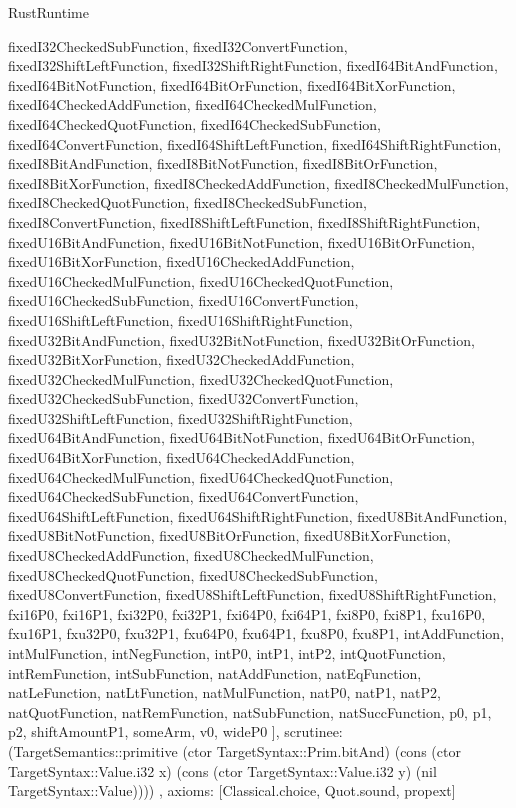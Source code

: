 \begin{lexlean}{RustRuntime}
\begin{semanticmodule}
{{      fixedI32CheckedSubFunction,
      fixedI32ConvertFunction,
      fixedI32ShiftLeftFunction,
      fixedI32ShiftRightFunction,
      fixedI64BitAndFunction,
      fixedI64BitNotFunction,
      fixedI64BitOrFunction,
      fixedI64BitXorFunction,
      fixedI64CheckedAddFunction,
      fixedI64CheckedMulFunction,
      fixedI64CheckedQuotFunction,
      fixedI64CheckedSubFunction,
      fixedI64ConvertFunction,
      fixedI64ShiftLeftFunction,
      fixedI64ShiftRightFunction,
      fixedI8BitAndFunction,
      fixedI8BitNotFunction,
      fixedI8BitOrFunction,
      fixedI8BitXorFunction,
      fixedI8CheckedAddFunction,
      fixedI8CheckedMulFunction,
      fixedI8CheckedQuotFunction,
      fixedI8CheckedSubFunction,
      fixedI8ConvertFunction,
      fixedI8ShiftLeftFunction,
      fixedI8ShiftRightFunction,
      fixedU16BitAndFunction,
      fixedU16BitNotFunction,
      fixedU16BitOrFunction,
      fixedU16BitXorFunction,
      fixedU16CheckedAddFunction,
      fixedU16CheckedMulFunction,
      fixedU16CheckedQuotFunction,
      fixedU16CheckedSubFunction,
      fixedU16ConvertFunction,
      fixedU16ShiftLeftFunction,
      fixedU16ShiftRightFunction,
      fixedU32BitAndFunction,
      fixedU32BitNotFunction,
      fixedU32BitOrFunction,
      fixedU32BitXorFunction,
      fixedU32CheckedAddFunction,
      fixedU32CheckedMulFunction,
      fixedU32CheckedQuotFunction,
      fixedU32CheckedSubFunction,
      fixedU32ConvertFunction,
      fixedU32ShiftLeftFunction,
      fixedU32ShiftRightFunction,
      fixedU64BitAndFunction,
      fixedU64BitNotFunction,
      fixedU64BitOrFunction,
      fixedU64BitXorFunction,
      fixedU64CheckedAddFunction,
      fixedU64CheckedMulFunction,
      fixedU64CheckedQuotFunction,
      fixedU64CheckedSubFunction,
      fixedU64ConvertFunction,
      fixedU64ShiftLeftFunction,
      fixedU64ShiftRightFunction,
      fixedU8BitAndFunction,
      fixedU8BitNotFunction,
      fixedU8BitOrFunction,
      fixedU8BitXorFunction,
      fixedU8CheckedAddFunction,
      fixedU8CheckedMulFunction,
      fixedU8CheckedQuotFunction,
      fixedU8CheckedSubFunction,
      fixedU8ConvertFunction,
      fixedU8ShiftLeftFunction,
      fixedU8ShiftRightFunction,
      fxi16P0,
      fxi16P1,
      fxi32P0,
      fxi32P1,
      fxi64P0,
      fxi64P1,
      fxi8P0,
      fxi8P1,
      fxu16P0,
      fxu16P1,
      fxu32P0,
      fxu32P1,
      fxu64P0,
      fxu64P1,
      fxu8P0,
      fxu8P1,
      intAddFunction,
      intMulFunction,
      intNegFunction,
      intP0,
      intP1,
      intP2,
      intQuotFunction,
      intRemFunction,
      intSubFunction,
      natAddFunction,
      natEqFunction,
      natLeFunction,
      natLtFunction,
      natMulFunction,
      natP0,
      natP1,
      natP2,
      natQuotFunction,
      natRemFunction,
      natSubFunction,
      natSuccFunction,
      p0,
      p1,
      p2,
      shiftAmountP1,
      someArm,
      v0,
      wideP0
    ],
    scrutinee: (TargetSemantics::primitive (ctor TargetSyntax::Prim.bitAnd) (cons (ctor TargetSyntax::Value.i32 x) (cons (ctor TargetSyntax::Value.i32 y) (nil TargetSyntax::Value))))
  },
  axioms: [Classical.choice, Quot.sound, propext]
}


\end{semanticmodule}
\end{lexlean}
